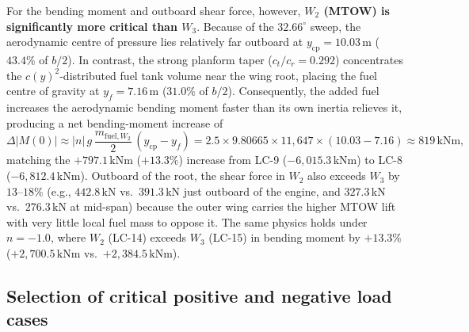 For the bending moment and outboard shear force, however, \textbf{$W_2$ (MTOW) is significantly more critical than $W_3$}. Because of the $32.66^\circ$ sweep, the aerodynamic centre of pressure lies relatively far outboard at $y_{\mathrm{cp}} = 10.03\,\text{m}$ ($43.4\%$ of $b/2$). In contrast, the strong planform taper ($c_t/c_r = 0.292$) concentrates the $c(y)^2$-distributed fuel tank volume near the wing root, placing the fuel centre of gravity at $y_f = 7.16\,\text{m}$ ($31.0\%$ of $b/2$). Consequently, the added fuel increases the aerodynamic bending moment faster than its own inertia relieves it, producing a net bending-moment increase of
\begin{equation}
    \Delta |M(0)| \approx |n|\,g\,\frac{m_{\mathrm{fuel},W_2}}{2}\,(y_{\mathrm{cp}} - y_f)
    = 2.5 \times 9.80665 \times 11{,}647 \times (10.03 - 7.16) \approx 819\,\text{kNm},
    \label{eq:fuel_moment_delta}
\end{equation}
matching the $+797.1\,\text{kNm}$ ($+13.3\%$) increase from LC-9 ($-6{,}015.3\,\text{kNm}$) to LC-8 ($-6{,}812.4\,\text{kNm}$). Outboard of the root, the shear force in $W_2$ also exceeds $W_3$ by $13\text{--}18\%$ (e.g., $442.8\,\text{kN}$ vs.\ $391.3\,\text{kN}$ just outboard of the engine, and $327.3\,\text{kN}$ vs.\ $276.3\,\text{kN}$ at mid-span) because the outer wing carries the higher MTOW lift with very little local fuel mass to oppose it. The same physics holds under $n = -1.0$, where $W_2$ (LC-14) exceeds $W_3$ (LC-15) in bending moment by $+13.3\%$ ($+2{,}700.5\,\text{kNm}$ vs.\ $+2{,}384.5\,\text{kNm}$).

\subsection{Selection of critical positive and negative load cases}

